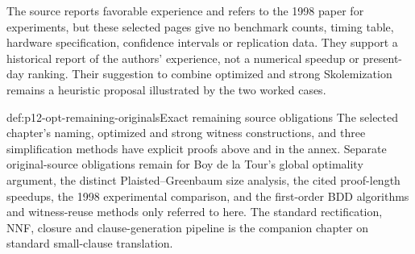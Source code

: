 The source reports favorable experience and refers to the 1998 paper
for experiments, but these selected pages give no benchmark counts,
timing table, hardware specification, confidence intervals or
replication data. They support a historical report of the authors'
experience, not a numerical speedup or present-day ranking.
Their suggestion to combine optimized and strong Skolemization
remains a heuristic proposal illustrated by the two worked cases.

\begin{proofboundary}{def:p12-opt-remaining-originals}{Exact remaining source obligations}
The selected chapter's naming, optimized and strong witness
constructions, and three simplification methods have explicit
proofs above and in the annex. Separate original-source obligations
remain for Boy de la Tour's global optimality argument, the distinct
Plaisted--Greenbaum size analysis, the cited proof-length speedups,
the 1998 experimental comparison, and the first-order BDD algorithms
and witness-reuse methods only referred to here. The standard
rectification, NNF, closure and clause-generation pipeline is the
companion chapter on standard small-clause translation.
\end{proofboundary}
